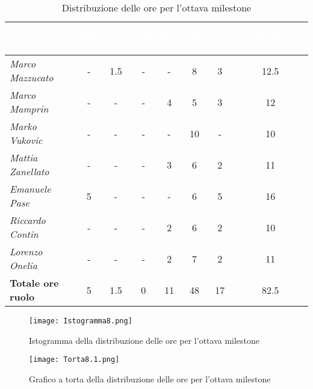 \begin{table}[H]
    \renewcommand\arraystretch{1.5}
    \centering
    \begin{tabular}{|l|c|c|c|c|c|c|c|}
    \hline
    \rowcolor[HTML]{036400}
    \textcolor{white}{\textbf{Membro}} & \multicolumn{1}{l|}{\textcolor{white}{\textbf{RE}}} & \multicolumn{1}{l|}{\textcolor{white}{\textbf{AM}}} & \multicolumn{1}{l|}{\textcolor{white}{\textbf{AN}}} & \multicolumn{1}{l|}{\textcolor{white}{\textbf{PT}}} & \multicolumn{1}{l|}{\textcolor{white}{\textbf{PR}}} & \multicolumn{1}{l|}{\textcolor{white}{\textbf{VE}}} & \multicolumn{1}{l|}{\textcolor{white}{\textbf{Totale ore persona}}} \\ \hline
    \rowcolor[HTML]{EFEFEF}\textit{Marco Mazzucato}  & - & 1.5 & -  & -    & 8   & 3    & 12.5     \\ \hline
    \rowcolor[HTML]{C0C0C0}\textit{Marco Mamprin}    & - & -   & -  & 4    & 5   & 3    & 12     \\ \hline
    \rowcolor[HTML]{EFEFEF}\textit{Marko Vukovic}    & - & -   & -  & -    & 10  & -    & 10     \\ \hline
    \rowcolor[HTML]{C0C0C0}\textit{Mattia Zanellato} & - & -   & -  & 3    & 6   & 2    & 11     \\ \hline
    \rowcolor[HTML]{EFEFEF}\textit{Emanuele Pase}    & 5 & -   & -  & -    & 6   & 5    & 16     \\ \hline
    \rowcolor[HTML]{C0C0C0}\textit{Riccardo Contin}  & - & -   & -  & 2    & 6   & 2    & 10     \\ \hline
    \rowcolor[HTML]{EFEFEF}\textit{Lorenzo Onelia}   & - & -   & -  & 2    & 7   & 2    & 11    \\ \hline
    \rowcolor[HTML]{C0C0C0}\textbf{Totale ore ruolo} & 5 & 1.5 & 0  & 11   & 48  & 17   & 82.5    \\ \hline
    \end{tabular}
    \caption{Distribuzione delle ore per l'ottava milestone}
\end{table}

\begin{figure}[H]
    \texttt{[image: Istogramma8.png]}
    \caption{Istogramma della distribuzione delle ore per l'ottava milestone}
\end{figure}

\begin{figure}[H]
    \texttt{[image: Torta8.1.png]}
    \caption{Grafico a torta della distribuzione delle ore per l'ottava milestone}
\end{figure}

